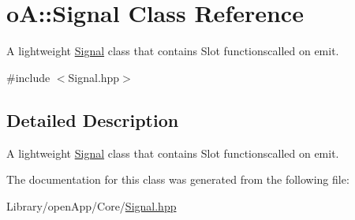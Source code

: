 \hypertarget{classo_a_1_1_signal}{}\section{oA\+:\+:Signal Class Reference}
\label{classo_a_1_1_signal}


A lightweight \mbox{\hyperlink{classo_a_1_1_signal}{Signal}} class that contains Slot functionscalled on emit.  




{\ttfamily \#include $<$Signal.\+hpp$>$}



\subsection{Detailed Description}
A lightweight \mbox{\hyperlink{classo_a_1_1_signal}{Signal}} class that contains Slot functionscalled on emit. 

The documentation for this class was generated from the following file\+:\begin{DoxyCompactItemize}
\item 
Library/open\+App/\+Core/\mbox{\hyperlink{_signal_8hpp}{Signal.\+hpp}}\end{DoxyCompactItemize}
